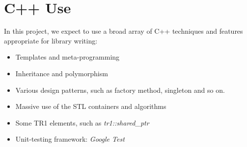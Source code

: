 \documentclass{article}
\begin{document}
%
%
%
\section{C++ Use}

In this project, we expect to use a broad array of C++ techniques and features appropriate for library writing:

\begin{itemize}
  \item Templates and meta-programming
  \item Inheritance and polymorphism
  \item Various design patterns, such as factory method, singleton and so on.
  \item Massive use of the STL containers and algorithms
  \item Some TR1 elements, such as \emph{tr1::shared\_ptr}
  \item Unit-testing framework:  \emph{Google Test}
\end{itemize}
\end{document}
